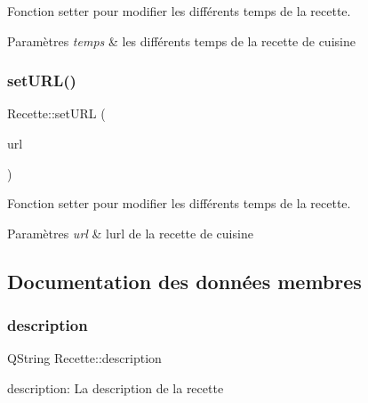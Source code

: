 Fonction setter pour modifier les différents temps de la recette. 


\begin{DoxyParams}{Paramètres}
{\em temps} & les différents temps de la recette de cuisine \\
\hline
\end{DoxyParams}
\mbox{\label{classRecette_aa8439657ab66d74a3fd38df05b8594d1}} 
\subsubsection{\texorpdfstring{set\+U\+R\+L()}{setURL()}}
{\footnotesize\ttfamily Recette\+::set\+U\+RL (\begin{DoxyParamCaption}\item[{const Q\+String \&}]{url }\end{DoxyParamCaption})}



Fonction setter pour modifier les différents temps de la recette. 


\begin{DoxyParams}{Paramètres}
{\em url} & l\textquotesingle{}url de la recette de cuisine \\
\hline
\end{DoxyParams}


\subsection{Documentation des données membres}
\mbox{\label{classRecette_a140933cc7041efba084ccc66a6dc666a}} 
\subsubsection{\texorpdfstring{description}{description}}
{\footnotesize\ttfamily Q\+String Recette\+::description\hspace{0.3cm}{\ttfamily [private]}}

description\+: La description de la recette \mbox{\label{classRecette_addbf40a642849e6583ac7fd3e2059e0d}} 

